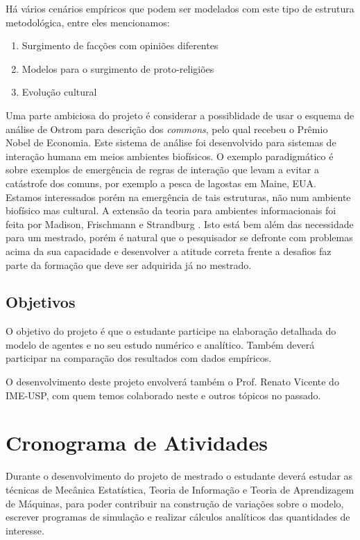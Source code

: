 \documentclass[12pt]{article}
\begin{document}
Há vários cenários empíricos que podem ser modelados com este tipo de estrutura metodológica, entre eles mencionamos:

\begin{enumerate}
\item Surgimento de facções com opiniões diferentes
\item Modelos para o surgimento de proto-religiões
\item Evolução cultural
\end{enumerate}


Uma parte ambiciosa do projeto é considerar a possiblidade de
usar o esquema de análise de Ostrom \cite{Ostrom} para descrição dos 
{\it commons}, pelo qual recebeu o Prêmio Nobel de Economia. Este sistema
de análise foi desenvolvido para sistemas de interação humana em meios 
ambientes biofísicos. O exemplo paradigmático é sobre exemplos de emergência
de regras de interação que levam a evitar a catástrofe dos comuns, por
exemplo a pesca de lagostas em Maine, EUA. 
Estamos interessados porém na emergência de tais estruturas, não num ambiente
biofísico mas cultural. A extensão da teoria para ambientes informacionais
foi feita por  Madison, Frischmann e 
Strandburg \cite{Strandburg}. Isto está bem além  das necessidade para um mestrado,
porém é natural que o pesquisador se defronte com problemas acima 
da sua capacidade e desenvolver a atitude correta frente a 
desafios faz parte da formação que deve ser adquirida já no mestrado.
\subsection{Objetivos}
O objetivo do projeto é que o estudante participe na elaboração detalhada
do modelo de agentes e no seu estudo numérico e analítico. Também deverá
participar na comparação dos resultados com dados empíricos.

O desenvolvimento deste projeto envolverá também o Prof. Renato Vicente
do IME-USP, com quem temos colaborado neste e outros tópicos no passado.

\newpage
\section{Cronograma de Atividades}
Durante o desenvolvimento do  projeto de mestrado o estudante deverá
estudar as técnicas de Mecânica Estatística, Teoria de Informação
e Teoria de Aprendizagem de Máquinas, para poder contribuir
na construção de variações sobre o modelo, escrever programas de simulação
e realizar cálculos analíticos das quantidades de interesse.
\end{document}
